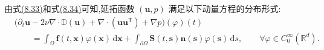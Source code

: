 \begin{note}[动量方程的分布形式]
\label{note:distributional-momentum-equation}
由式\hyperref[eq:distributional-pressure-gradient]{(8.33)}和式\hyperref[eq:distributional-viscous-divergence]{(8.34)}可知,延拓函数 $(\bm{u},p)$ 满足以下动量方程的分布形式:
\begin{equation}\label{eq:distributional-momentum-equation}
\begin{aligned}
 &\bigl(
   \partial_t\bm{u}
   -2\nu\nabla\cdot\mathbb{D}(\bm{u})
   +\nabla\cdot(\bm{u}\bm{u}^{\mathsf T})
   +\nabla p
  \bigr)(\varphi)(t)\\
 &\qquad
  =\int_\Omega
      \bm{f}(t,\bm{x})\varphi(\bm{x})
      \,\mathrm{d}\bm{x}
    +\int_{\partial\Omega}
      \bm{S}(t,\bm{s})\bm{n}(\bm{s})
      \varphi(\bm{s})\,\mathrm{d}s,
 \qquad
 \forall\varphi\in C_0^\infty(\mathbb{R}^d).
\end{aligned}
\end{equation}
\end{note}

